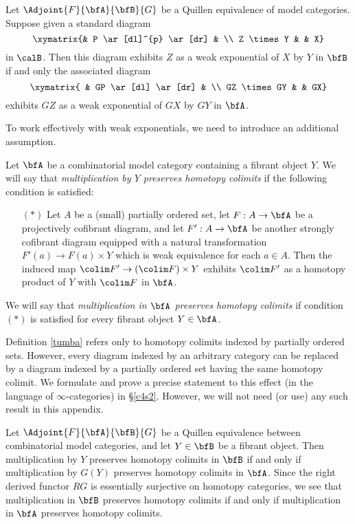 \begin{Simplicial Categories}
\begin{remark}\label{toofus}
Let $\Adjoint{F}{\bfA}{\bfB}{G}$ be a Quillen equivalence of model categories.
Suppose given a standard diagram
$$ \xymatrix{&  P \ar[dl]^{p} \ar[dr] &  \\
Z \times Y & & X}$$
in $\calB$. Then this diagram exhibits $Z$ as a weak exponential of $X$ by $Y$ in
$\bfB$ if and only the associated diagram
$$ \xymatrix{ & GP \ar[dl] \ar[dr] & \\
GZ \times GY & & GX}$$
exhibits $GZ$ as a weak exponential of $GX$ by $GY$ in $\bfA$.
\end{remark}

To work effectively with weak exponentials, we need to introduce an additional assumption.

\begin{definition}\label{tumba}
Let $\bfA$ be a combinatorial model category containing a fibrant object
$Y$. We will say that {\it multiplication by $Y$ preserves homotopy colimits}
if the following condition is satisfied:
\begin{itemize}
\item[$(\ast)$] Let $A$ be a (small) partially ordered set, let $F: A \rightarrow \bfA$
be a projectively cofibrant diagram, and let $F': A \rightarrow \bfA$ be another strongly
cofibrant diagram equipped with a natural transformation $F'(a) \rightarrow F(a) \times Y$
which is weak equivalence for each $a \in A$. Then the induced map
$\colim F' \rightarrow (\colim F) \times Y$ exhibits $\colim F'$ as a homotopy product
of $Y$ with $\colim F$ in $\bfA$.
\end{itemize}
We will say that {\it multiplication in $\bfA$ preserves homotopy colimits} if
condition $(\ast)$ is satisfied for every fibrant object $Y \in \bfA$.
\end{definition}

\begin{remark}
Definition \ref{tumba} refers only to homotopy colimits indexed by partially ordered sets.
However, every diagram indexed by an arbitrary category can be replaced by a diagram
indexed by a partially ordered set having the same homotopy colimit. We formulate and prove a precise statement to this effect (in the language of $\infty$-categories) in \S \ref{c4s2}. However, we will not need (or use) any such result in this appendix.
\end{remark}

\begin{remark}\label{canus}
Let $\Adjoint{F}{\bfA}{\bfB}{G}$ be a Quillen equivalence between combinatorial
model categories, and let $Y \in \bfB$ be a fibrant object. Then multiplication by
$Y$ preserves homotopy colimits in $\bfB$ if and only if multiplication by
$G(Y)$ preserves homotopy colimits in $\bfA$. Since the right derived functor $RG$
is essentially surjective on homotopy categories, we see that
multiplication in $\bfB$ preserves homotopy colimits if and only if multiplication in $\bfA$ preserves homotopy colimits.
\end{remark}


\end{Simplicial Categories}
